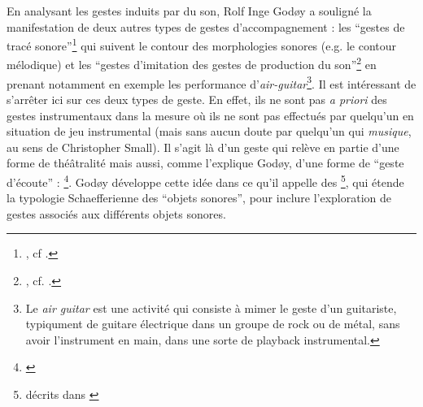 \indent En analysant les gestes induits par du son, Rolf Inge Godøy a souligné la manifestation de deux autres types de gestes d'accompagnement : les ``gestes de tracé sonore''\footnote{, cf \cite{godoy_exploring_2006}.} qui suivent le contour des morphologies sonores (e.g. le contour mélodique) et les ``gestes d'imitation des gestes de production du son''\footnote{, cf. \cite{godoy_playing_2005}.} en prenant notamment en exemple les performance d'\textit{air-guitar}\footnote{Le \textit{air guitar} est une activité qui consiste à mimer le geste d’un guitariste, typiqument de guitare électrique dans un groupe de rock ou de métal, sans avoir l’instrument en main, dans une sorte de playback instrumental.}. Il est intéressant de s'arrêter ici sur ces deux types de geste. En effet, ils ne sont pas \textit{a priori} des gestes instrumentaux dans la mesure où ils ne sont pas effectués par quelqu'un en situation de jeu instrumental (mais sans aucun doute par quelqu'un qui \textit{musique}, au sens de Christopher Small). Il s'agit là d'un geste qui relève en partie d'une forme de théâtralité mais aussi, comme l'explique Godøy, d'une forme de ``geste d'écoute'' :  \footnote{\cite{godoy_exploring_2006}}. Godøy développe cette idée dans ce qu'il appelle des \footnote{ décrits dans \cite{godoy_gestural-sonorous_2006}}, qui étende la typologie Schaefferienne des ``objets sonores''\cite{schaeffer_traite_1966}, pour inclure l'exploration de gestes associés aux différents objets sonores.\\
